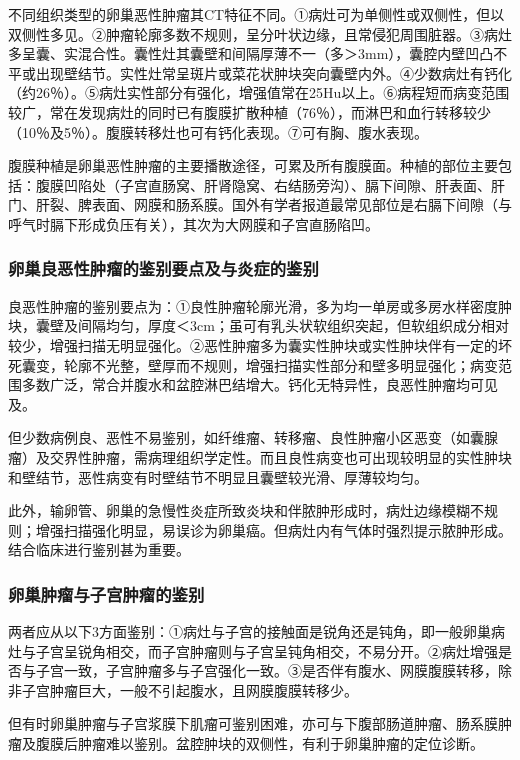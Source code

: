 不同组织类型的卵巢恶性肿瘤其CT特征不同。①病灶可为单侧性或双侧性，但以双侧性多见。②肿瘤轮廓多数不规则，呈分叶状边缘，且常侵犯周围脏器。③病灶多呈囊、实混合性。囊性灶其囊壁和间隔厚薄不一（多＞3mm），囊腔内壁凹凸不平或出现壁结节。实性灶常呈斑片或菜花状肿块突向囊壁内外。④少数病灶有钙化（约26％）。⑤病灶实性部分有强化，增强值常在25Hu以上。⑥病程短而病变范围较广，常在发现病灶的同时已有腹膜扩散种植（76％），而淋巴和血行转移较少（10％及5％）。腹膜转移灶也可有钙化表现。⑦可有胸、腹水表现。

腹膜种植是卵巢恶性肿瘤的主要播散途径，可累及所有腹膜面。种植的部位主要包括：腹膜凹陷处（子宫直肠窝、肝肾隐窝、右结肠旁沟）、膈下间隙、肝表面、肝门、肝裂、脾表面、网膜和肠系膜。国外有学者报道最常见部位是右膈下间隙（与呼气时膈下形成负压有关），其次为大网膜和子宫直肠陷凹。

\subsubsection{卵巢良恶性肿瘤的鉴别要点及与炎症的鉴别}

良恶性肿瘤的鉴别要点为：①良性肿瘤轮廓光滑，多为均一单房或多房水样密度肿块，囊壁及间隔均匀，厚度＜3cm；虽可有乳头状软组织突起，但软组织成分相对较少，增强扫描无明显强化。②恶性肿瘤多为囊实性肿块或实性肿块伴有一定的坏死囊变，轮廓不光整，壁厚而不规则，增强扫描实性部分和壁多明显强化；病变范围多数广泛，常合并腹水和盆腔淋巴结增大。钙化无特异性，良恶性肿瘤均可见及。

但少数病例良、恶性不易鉴别，如纤维瘤、转移瘤、良性肿瘤小区恶变（如囊腺瘤）及交界性肿瘤，需病理组织学定性。而且良性病变也可出现较明显的实性肿块和壁结节，恶性病变有时壁结节不明显且囊壁较光滑、厚薄较均匀。

此外，输卵管、卵巢的急慢性炎症所致炎块和伴脓肿形成时，病灶边缘模糊不规则；增强扫描强化明显，易误诊为卵巢癌。但病灶内有气体时强烈提示脓肿形成。结合临床进行鉴别甚为重要。

\subsubsection{卵巢肿瘤与子宫肿瘤的鉴别}

两者应从以下3方面鉴别：①病灶与子宫的接触面是锐角还是钝角，即一般卵巢病灶与子宫呈锐角相交，而子宫肿瘤则与子宫呈钝角相交，不易分开。②病灶增强是否与子宫一致，子宫肿瘤多与子宫强化一致。③是否伴有腹水、网膜腹膜转移，除非子宫肿瘤巨大，一般不引起腹水，且网膜腹膜转移少。

但有时卵巢肿瘤与子宫浆膜下肌瘤可鉴别困难，亦可与下腹部肠道肿瘤、肠系膜肿瘤及腹膜后肿瘤难以鉴别。盆腔肿块的双侧性，有利于卵巢肿瘤的定位诊断。

